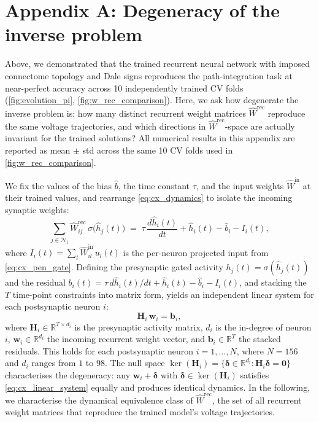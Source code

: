 \documentclass[11pt]{article}
\begin{document}
\clearpage

\section*{Appendix A: Degeneracy of the inverse problem}
\label{app:degeneracy_cx}

Above, we demonstrated that the trained recurrent neural network with imposed connectome topology and Dale signs reproduces the path-integration task at near-perfect accuracy across 10 independently trained CV folds (\cref{fig:evolution_pi}, \cref{fig:w_rec_comparison}). Here, we ask how degenerate the inverse problem is: how many distinct recurrent weight matrices $\hat{W}^{\mathrm{rec}}$ reproduce the same voltage trajectories, and which directions in $\hat{W}^{\mathrm{rec}}$-space are actually invariant for the trained solutions? All numerical results in this appendix are reported as mean $\pm$ std across the same 10 CV folds used in \cref{fig:w_rec_comparison}.

We fix the values of the bias $\hat{b}$, the time constant $\tau$, and the input weights $\hat{W}^{\mathrm{in}}$ at their trained values, and rearrange \cref{eq:cx_dynamics} to isolate the incoming synaptic weights:
\begin{equation}
\sum_{j\in\mathcal{N}_i} \hat{W}^{\mathrm{rec}}_{ij}\,\sigma\!\big(\hat{h}_j(t)\big)
\;=\; \tau\,\frac{d\hat{h}_i(t)}{dt} + \hat{h}_i(t) - \hat{b}_i - I_i(t),
\end{equation}
where $I_i(t) = \sum_l \hat{W}^{\mathrm{in}}_{il}\,u_l(t)$ is the per-neuron projected input from \cref{eq:cx_pen_gate}. Defining the presynaptic gated activity $h_j(t) = \sigma(\hat{h}_j(t))$ and the residual $b_i(t) = \tau\,d\hat{h}_i(t)/dt + \hat{h}_i(t) - \hat{b}_i - I_i(t)$, and stacking the $T$ time-point constraints into matrix form, yields an independent linear system for each postsynaptic neuron $i$:
\begin{equation}
\mathbf{H}_i\,\mathbf{w}_i = \mathbf{b}_i,
\label{eq:cx_linear_system}
\end{equation}
where $\mathbf{H}_i \in \mathbb{R}^{T \times d_i}$ is the presynaptic activity matrix, $d_i$ is the in-degree of neuron $i$, $\mathbf{w}_i \in \mathbb{R}^{d_i}$ the incoming recurrent weight vector, and $\mathbf{b}_i \in \mathbb{R}^T$ the stacked residuals. This holds for each postsynaptic neuron $i = 1, \ldots, N$, where $N = 156$ and $d_i$ ranges from $1$ to $98$. The null space $\ker(\mathbf{H}_i) = \{\boldsymbol{\delta} \in \mathbb{R}^{d_i} : \mathbf{H}_i\boldsymbol{\delta} = \mathbf{0}\}$ characterises the degeneracy: any $\mathbf{w}_i + \boldsymbol{\delta}$ with $\boldsymbol{\delta} \in \ker(\mathbf{H}_i)$ satisfies \cref{eq:cx_linear_system} equally and produces identical dynamics. In the following, we characterise the dynamical equivalence class of $\hat{W}^{\mathrm{rec}}$, the set of all recurrent weight matrices that reproduce the trained model's voltage trajectories.
\end{document}
